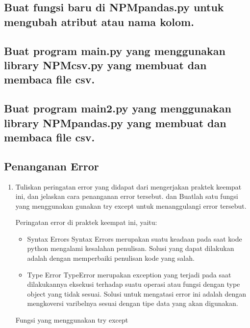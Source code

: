 \subsection{Buat fungsi baru di NPMpandas.py untuk mengubah atribut atau nama kolom.}


\subsection{Buat program main.py yang menggunakan library NPMcsv.py yang membuat dan membaca file csv.}


\subsection{Buat program main2.py yang menggunakan library NPMpandas.py yang membuat dan membaca file csv.}


\subsection{Penanganan Error}
\begin{enumerate}
	\item Tuliskan  peringatan  error  yang  didapat  dari  mengerjakan  praktek  keempat  ini, dan  jelaskan  cara  penanganan  error  tersebut.   dan  Buatlah  satu  fungsi  yang menggunakan gunakan try except untuk menanggulangi error tersebut.
	
	Peringatan error di praktek keempat ini, yaitu:
	\begin{itemize}
		\item Syntax Errors
		Syntax Errors merupakan suatu keadaan pada saat kode python mengalami kesalahan penulisan. Solusi yang dapat dilakukan adalah dengan memperbaiki penulisan kode yang salah.
		
		\item Type Error
		TypeError merupakan exception yang terjadi pada saat dilakukannya eksekusi terhadap suatu operasi atau fungsi dengan type object yang tidak sesuai. Solusi untuk mengatasi error ini adalah dengan mengkoversi varibelnya sesuai dengan tipe data yang akan digunakan.
	\end{itemize}
	
	Fungsi yang menggunakan try except
	
\end{enumerate}



